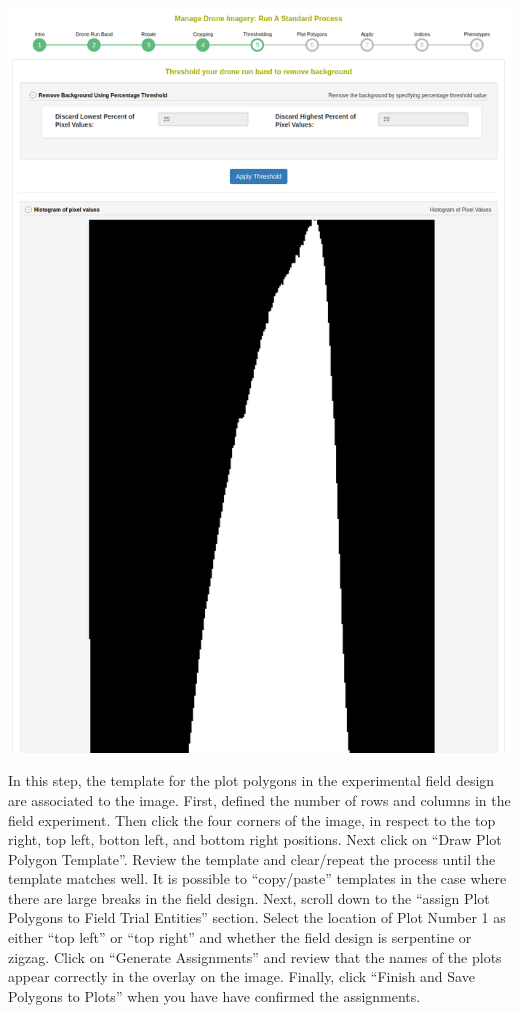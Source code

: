 \documentclass[
  12pt,
]{book}
\begin{document}
\begin{center}\includegraphics[width=0.95\linewidth]{assets/images/manage_image_phenotyping_standard_process_threshold_hist} \end{center}

In this step, the template for the plot polygons in the experimental field design are associated to the image. First, defined the number of rows and columns in the field experiment. Then click the four corners of the image, in respect to the top right, top left, botton left, and bottom right positions. Next click on ``Draw Plot Polygon Template''. Review the template and clear/repeat the process until the template matches well. It is possible to ``copy/paste'' templates in the case where there are large breaks in the field design. Next, scroll down to the ``assign Plot Polygons to Field Trial Entities'' section. Select the location of Plot Number 1 as either ``top left'' or ``top right'' and whether the field design is serpentine or zigzag. Click on ``Generate Assignments'' and review that the names of the plots appear correctly in the overlay on the image. Finally, click ``Finish and Save Polygons to Plots'' when you have have confirmed the assignments.
\end{document}
